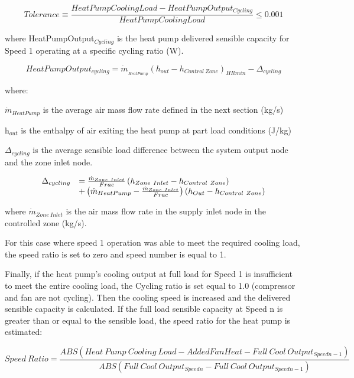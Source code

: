 \begin{equation}
  Tolerance \equiv \frac{HeatPumpCoolingLoad - HeatPumpOutput_{Cycling}}{HeatPumpCoolingLoad} \leq 0.001
\end{equation}

where HeatPumpOutput\(_{Cycling}\) is the heat pump delivered sensible capacity for Speed 1 operating at a specific cycling ratio (W).

\begin{equation}
HeatPumpOutpu{t_{cycling}} = {\dot m_{_{HeatPump}}}{\left( {{h_{out}} - {h_{Control~Zone}}} \right)_{HRmin}} - {\Delta_{cycling}}
\end{equation}

where:

\({\dot m_{HeatPump}}\) is the average air mass flow rate defined in the next section (kg/s)

h\(_{out}\) is the enthalpy of air exiting the heat pump at part load conditions (J/kg)

\(\Delta_{cycling}\) is the average sensible load difference between the system output node and the zone inlet node.

\begin{equation}
  \begin{array}{rl}
    \Delta_{cycling} &= \frac{\dot{m}_{Zone~Inlet}}{Frac} \left(h_{Zone~Inlet}-h_{Control~Zone}\right) \\
                           &+ \left(\dot{m}_{HeatPump} - \frac{\dot{m}_{Zone~Inlet}}{Frac}\right) \left(h_{Out} - h_{Control~Zone}\right)
  \end{array}
\end{equation}

where \({{{\dot m}_{Zone~Inlet}}}\) is the air mass flow rate in the supply inlet node in the controlled zone (kg/s).

For this case where speed 1 operation was able to meet the required cooling load, the speed ratio is set to zero and speed number is equal to 1.

Finally, if the heat pump's cooling output at full load for Speed 1 is insufficient to meet the entire cooling load, the Cycling ratio is set equal to 1.0 (compressor and fan are not cycling). Then the cooling speed is increased and the delivered sensible capacity is calculated. If the full load sensible capacity at Speed n is greater than or equal to the sensible load, the speed ratio for the heat pump is estimated:

\begin{equation}
Speed~Ratio = \frac{{ABS(Heat~Pump~Cooling~Load - AddedFanHeat - Full~Cool~ Outpu{t_{Speedn-1}})}}{{ABS(Full~Cool~Outpu{t_{Speedn}} - Full~Cool~Outpu{t_{Speedn-1}})}} 
\end{equation}

